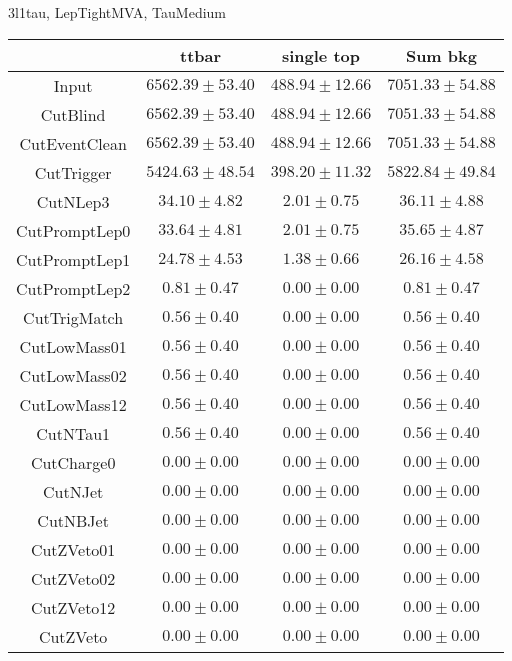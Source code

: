 \documentclass[11pt]{article}
\begin{document}
3l1tau, LepTightMVA, TauMedium \\
\begin{tabular}{|c|c|c|c|}
\hline
              & ttbar               & single top         & Sum bkg            \\
\hline
Input         & $6562.39 \pm 53.40$ & $488.94 \pm 12.66$ & $7051.33 \pm 54.88$\\
CutBlind      & $6562.39 \pm 53.40$ & $488.94 \pm 12.66$ & $7051.33 \pm 54.88$\\
CutEventClean & $6562.39 \pm 53.40$ & $488.94 \pm 12.66$ & $7051.33 \pm 54.88$\\
CutTrigger    & $5424.63 \pm 48.54$ & $398.20 \pm 11.32$ & $5822.84 \pm 49.84$\\
CutNLep3      &    $34.10 \pm 4.82$ &    $2.01 \pm 0.75$ &    $36.11 \pm 4.88$\\
CutPromptLep0 &    $33.64 \pm 4.81$ &    $2.01 \pm 0.75$ &    $35.65 \pm 4.87$\\
CutPromptLep1 &    $24.78 \pm 4.53$ &    $1.38 \pm 0.66$ &    $26.16 \pm 4.58$\\
CutPromptLep2 &     $0.81 \pm 0.47$ &    $0.00 \pm 0.00$ &     $0.81 \pm 0.47$\\
CutTrigMatch  &     $0.56 \pm 0.40$ &    $0.00 \pm 0.00$ &     $0.56 \pm 0.40$\\
CutLowMass01  &     $0.56 \pm 0.40$ &    $0.00 \pm 0.00$ &     $0.56 \pm 0.40$\\
CutLowMass02  &     $0.56 \pm 0.40$ &    $0.00 \pm 0.00$ &     $0.56 \pm 0.40$\\
CutLowMass12  &     $0.56 \pm 0.40$ &    $0.00 \pm 0.00$ &     $0.56 \pm 0.40$\\
CutNTau1      &     $0.56 \pm 0.40$ &    $0.00 \pm 0.00$ &     $0.56 \pm 0.40$\\
CutCharge0    &     $0.00 \pm 0.00$ &    $0.00 \pm 0.00$ &     $0.00 \pm 0.00$\\
CutNJet       &     $0.00 \pm 0.00$ &    $0.00 \pm 0.00$ &     $0.00 \pm 0.00$\\
CutNBJet      &     $0.00 \pm 0.00$ &    $0.00 \pm 0.00$ &     $0.00 \pm 0.00$\\
CutZVeto01    &     $0.00 \pm 0.00$ &    $0.00 \pm 0.00$ &     $0.00 \pm 0.00$\\
CutZVeto02    &     $0.00 \pm 0.00$ &    $0.00 \pm 0.00$ &     $0.00 \pm 0.00$\\
CutZVeto12    &     $0.00 \pm 0.00$ &    $0.00 \pm 0.00$ &     $0.00 \pm 0.00$\\
CutZVeto      &     $0.00 \pm 0.00$ &    $0.00 \pm 0.00$ &     $0.00 \pm 0.00$\\
\hline
\end{tabular}
\end{document}
